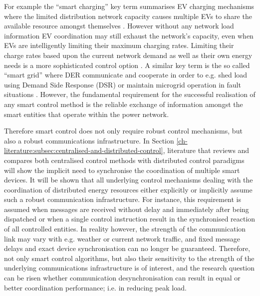 For example the ``smart charging'' key term summarises EV charging mechanisms where the limited distribution network capacity causes multiple EVs to share the available resource amongst themselves \cite{Sortomme2011, Vaya2012, Garcia-Villalobos2014}.
However without any network load information EV coordination may still exhaust the network's capacity, even when EVs are intelligently limiting their maximum charging rates.
Limiting their charge rates based upon the current network demand as well as their own energy needs is a more sophisticated control option \cite{Karfopoulos2013}.
A similar key term is the so called ``smart grid'' where DER communicate and cooperate in order to e.g. shed load using Demand Side Response (DSR) or maintain microgrid operation in fault situations \cite{Samadi2012, Liu2014, Liang2014}.
However, the fundamental requirement for the successful realisation of any smart control method is the reliable exchange of information amongst the smart entities that operate within the power network.

Therefore smart control does not only require robust control mechanisms, but also a robust communications infrastructure.
In Section \ref{ch-literature:subsec:centralised-and-distributed-control}, literature that reviews and compares both centralised control methods with distributed control paradigms will show the implicit need to synchronise the coordination of multiple smart devices.
It will be shown that all underlying control mechanisms dealing with the coordination of distributed energy resources either explicitly or implicitly assume such a robust communication infrastructure.
For instance, this requirement is assumed when messages are received without delay and immediately after being dispatched or when a single control instruction result in the synchronised reaction of all controlled entities.
In reality however, the strength of the communication link may vary with e.g. weather or current network traffic, and fixed message delays and exact device synchronisation can no longer be guaranteed.
Therefore, not only smart control algorithms, but also their sensitivity to the strength of the underlying communications infrastructure is of interest, and the research question can be risen whether communication desynchronisation can result in equal or better coordination performance; i.e. in reducing peak load.

